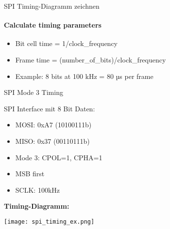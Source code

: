 \begin{KR}{SPI Timing-Diagramm zeichnen}
    \paragraph{Calculate timing parameters}
    \begin{itemize}
        \item Bit cell time = 1/clock\_frequency
        \item Frame time = (number\_of\_bits)/clock\_frequency
        \item Example: 8 bits at 100 kHz = 80 µs per frame
    \end{itemize}

\end{KR}

\begin{example2}{SPI Mode 3 Timing}\\
    \begin{minipage}{0.5\linewidth}
    SPI Interface mit 8 Bit Daten:
    \begin{itemize}
        \item MOSI: 0xA7 (10100111b)
        \item MISO: 0x37 (00110111b)
    \end{itemize}
    \end{minipage}
    \begin{minipage}{0.5\linewidth}
    \begin{itemize}
        \item Mode 3: CPOL=1, CPHA=1
        \item MSB first
        \item SCLK: 100kHz
    \end{itemize}
    \end{minipage}
    
    \textbf{Timing-Diagramm:}
    \begin{center}
    \texttt{[image: spi\_timing\_ex.png]}
    \end{center}


\end{example2}
